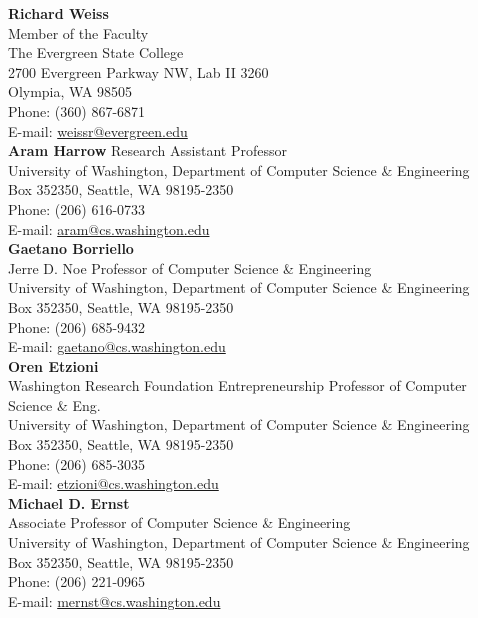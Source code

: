 \documentclass[letter]{article}
\begin{document}
\pagebreak

{\bf Richard Weiss}
\\
Member of the Faculty\\
The Evergreen State College\\
2700 Evergreen Parkway NW, Lab II 3260\\
Olympia, WA 98505\\
Phone: (360) 867-6871\\
E-mail: \url{weissr@evergreen.edu}\\

{\bf Aram Harrow}
Research Assistant Professor\\
University of Washington, Department of Computer Science \& Engineering\\
Box 352350, Seattle, WA 98195-2350\\
Phone: (206) 616-0733\\
E-mail: \url{aram@cs.washington.edu}\\

{\bf Gaetano Borriello}\\
Jerre D. Noe Professor of Computer Science \& Engineering\\
University of Washington, Department of Computer Science \& Engineering\\
Box 352350, Seattle, WA 98195-2350\\
Phone: (206) 685-9432\\
E-mail: \url{gaetano@cs.washington.edu}\\

{\bf Oren Etzioni}\\
Washington Research Foundation Entrepreneurship Professor of Computer Science \& Eng.\\
University of Washington, Department of Computer Science \& Engineering\\
Box 352350, Seattle, WA 98195-2350\\
Phone: (206) 685-3035\\
E-mail: \url{etzioni@cs.washington.edu}\\

{\bf Michael D. Ernst}\\
Associate Professor of Computer Science \& Engineering\\
University of Washington, Department of Computer Science \& Engineering\\
Box 352350, Seattle, WA 98195-2350\\
Phone: (206) 221-0965\\
E-mail: \url{mernst@cs.washington.edu}\\
\end{document}
